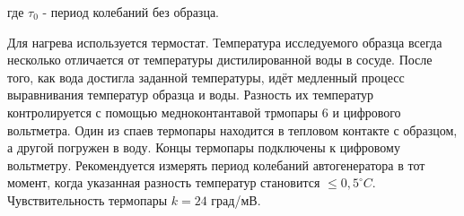 \documentclass[a4paper, 12pt]{article}%
\begin{document}
где $\tau_0$ - период колебаний без образца.

\vspace{0.5cm}

Для нагрева используется термостат. Температура исследуемого образца всегда несколько отличается от температуры дистилированной воды в сосуде. После того, как вода достигла заданной температуры, идёт медленный процесс выравнивания температур образца и воды. Разность их температур контролируется с помощью медноконтантавой трмопары 6 и цифрового вольтметра. Один из спаев термопары находится в тепловом контакте с образцом, а другой погружен в воду. Концы термопары подключены к цифровому вольтметру. Рекомендуется измерять период колебаний автогенератора в тот момент, когда указанная разность температур становится $\leq 0,5^{\circ} C$. Чувствительность термопары $k = 24$ град/мВ.
\end{document}
